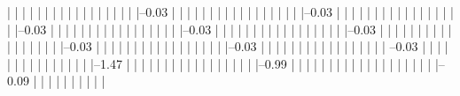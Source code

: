             |          |          |          |          |          |          |          |          |          
            |          |          |          |          |          |          |          |          |--0.03%
            |          |          |          |          |          |          |          |          |          
            |          |          |          |          |          |          |          |          |--0.03%
            |          |          |          |          |          |          |          |          |          
            |          |          |          |          |          |          |          |          |--0.03%
            |          |          |          |          |          |          |          |          |          
            |          |          |          |          |          |          |          |          |--0.03%
            |          |          |          |          |          |          |          |          |          
            |          |          |          |          |          |          |          |          |--0.03%
            |          |          |          |          |          |          |          |          |          
            |          |          |          |          |          |          |          |          |--0.03%
            |          |          |          |          |          |          |          |          |          
            |          |          |          |          |          |          |          |          |--0.03%
            |          |          |          |          |          |          |          |          |          
            |          |          |          |          |          |          |          |           --0.03%
            |          |          |          |          |          |          |          |          
            |          |          |          |          |          |          |          |--1.47%
            |          |          |          |          |          |          |          |          |          
            |          |          |          |          |          |          |          |          |--0.99%
            |          |          |          |          |          |          |          |          |          |          
            |          |          |          |          |          |          |          |          |          |--0.09%
            |          |          |          |          |          |          |          |          |          |          
